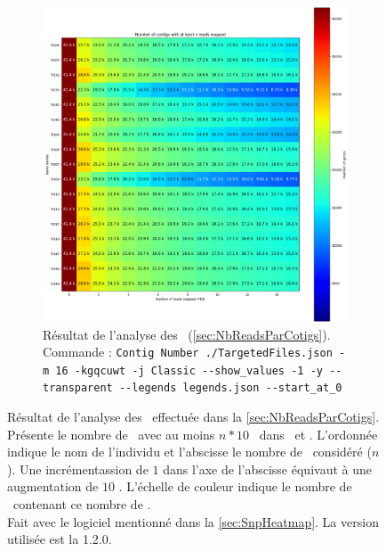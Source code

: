 \documentclass[../main]{subfiles} %
\begin{document}
\begin{landscape}
\begin{figure}[p]
\begin{subfigure}[b]{0.55\paperwidth}
        \includegraphics[width=\textwidth]{../Illustrations/Mo_Analysis_Contig_Heatmap_global.png}
        \caption{Résultat de l'analyse des \BamTrMo (\ref{sec:NbReadsParCotigs}).\\
        Commande : \lstinline{Contig Number ./TargetedFiles.json -m 16 -kgqcuwt -j Classic --show_values -1 -y --transparent --legends legends.json --start_at_0}  
        }
        \label{fig:ContigsMoClassic}
    \end{subfigure}
    
      \caption{Résultat de l'analyse des \bam effectuée dans la \ref{sec:NbReadsParCotigs}. Présente le nombre de \contigs avec au moins $n * 10$ \reads dans \BamTrEx et \BamTrMo. L'ordonnée indique le nom de l'individu et l'abscisse le nombre de \reads considéré ($n$). Une incrémentassion de $1$ dans l'axe de l'abscisse équivaut à une augmentation de $10$ \reads. L'échelle de couleur indique le nombre de \contigs contenant ce nombre de \reads. \\ Fait avec le logiciel mentionné dans la \ref{sec:SnpHeatmap}. La version utilisée est la 1.2.0.}
    \label{fig:ContigClassicHeatmap}
    
\end{figure}
\end{landscape}
\restoregeometry
\end{document}
